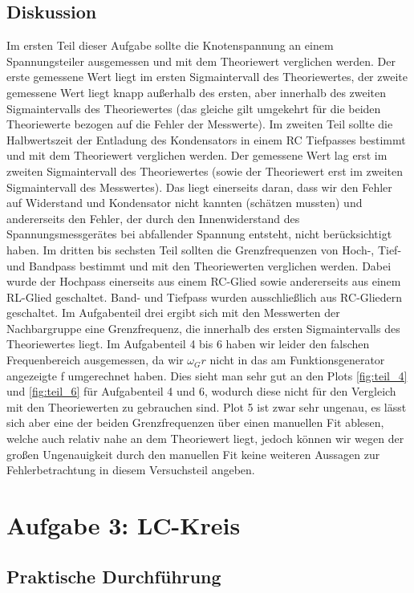 \documentclass[12pt]{scrartcl}
\begin{document}
\subsection{Diskussion}
Im ersten Teil dieser Aufgabe sollte die Knotenspannung an einem Spannungsteiler ausgemessen und mit dem Theoriewert verglichen werden. Der erste gemessene Wert liegt im ersten Sigmaintervall des Theoriewertes, der zweite gemessene Wert liegt knapp außerhalb des ersten, aber innerhalb des zweiten Sigmaintervalls des Theoriewertes (das gleiche gilt umgekehrt für die beiden Theoriewerte bezogen auf die Fehler der Messwerte). 
Im zweiten Teil sollte die Halbwertszeit der Entladung des Kondensators in einem RC Tiefpasses bestimmt und mit dem Theoriewert verglichen werden. Der gemessene Wert lag erst im zweiten Sigmaintervall des Theoriewertes (sowie der Theoriewert erst im zweiten Sigmaintervall des Messwertes). Das liegt einerseits daran, dass wir den Fehler auf Widerstand und Kondensator nicht kannten (schätzen mussten) und andererseits den Fehler, der durch den Innenwiderstand des Spannungsmessgerätes bei abfallender Spannung entsteht, nicht berücksichtigt haben.
Im dritten bis sechsten Teil sollten die Grenzfrequenzen von Hoch-, Tief- und Bandpass bestimmt und mit den Theoriewerten verglichen werden. Dabei wurde der Hochpass einerseits aus einem RC-Glied sowie andererseits aus einem RL-Glied geschaltet. Band- und Tiefpass wurden ausschließlich aus RC-Gliedern geschaltet. Im Aufgabenteil drei ergibt sich mit den Messwerten der Nachbargruppe eine Grenzfrequenz, die innerhalb des ersten Sigmaintervalls des Theoriewertes liegt.
Im Aufgabenteil 4 bis 6 haben wir leider den falschen Frequenbereich ausgemessen, da wir $\omega_Gr$ nicht in das am Funktionsgenerator angezeigte f umgerechnet haben.
Dies sieht man sehr gut an den Plots
\ref{fig:teil_4} und \ref{fig:teil_6}
für Aufgabenteil 4 und 6, wodurch diese nicht für den Vergleich mit den Theoriewerten zu gebrauchen sind.
Plot 5 ist zwar sehr ungenau, es lässt sich aber eine der beiden Grenzfrequenzen über einen manuellen Fit ablesen, welche auch relativ nahe an dem Theoriewert liegt, jedoch können wir wegen der großen Ungenauigkeit durch den manuellen Fit keine weiteren Aussagen zur Fehlerbetrachtung in diesem Versuchsteil angeben.
\section{Aufgabe 3: LC-Kreis}
\subsection{Praktische Durchführung}
\end{document}
